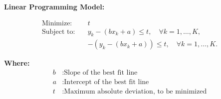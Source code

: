 \documentclass{article}
\begin{document}
\textbf{Linear Programming Model:}

\begin{align*}
\text{Minimize:} \quad & t \\
\text{Subject to:} \quad & y_k - (bx_k + a) \leq t, \quad \forall k = 1, \dots, K, \\
                        & -(y_k - (bx_k + a)) \leq t, \quad \forall k = 1, \dots, K.
\end{align*}

\textbf{Where:}
\begin{align*}
b & : \text{Slope of the best fit line} \\
a & : \text{Intercept of the best fit line} \\
t & : \text{Maximum absolute deviation, to be minimized}
\end{align*}
\end{document}
